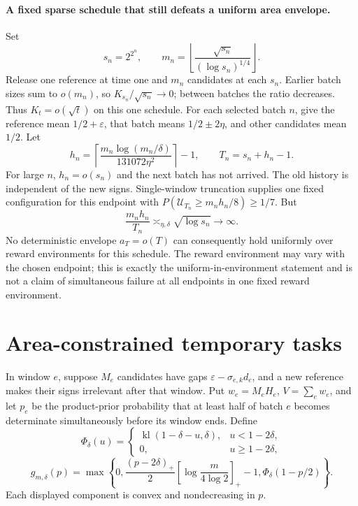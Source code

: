 \documentclass[11pt]{article}
\theoremstyle{remark}
\begin{document}
\paragraph{A fixed sparse schedule that still defeats a uniform area envelope.}
Set
\[
 s_n=2^{2^n},\qquad
 m_n=\left\lfloor\frac{\sqrt{s_n}}{(\log s_n)^{1/4}}\right\rfloor.
\]
Release one reference at time one and $m_n$ candidates at each $s_n$.
Earlier batch sizes sum to $o(m_n)$, so $K_{s_n}/\sqrt{s_n}\to0$; between
batches the ratio decreases. Thus $K_t=o(\sqrt t)$ on this one schedule.
For each selected batch $n$, give the reference mean $1/2+\varepsilon$,
that batch means $1/2\pm2\eta$, and other candidates mean $1/2$. Let
\[
 h_n=\left\lceil\frac{m_n\log(m_n/\delta)}{131072\eta^2}\right\rceil-1,
 \qquad T_n=s_n+h_n-1.
\]
For large $n$, $h_n=o(s_n)$ and the next batch has not arrived. The old
history is independent of the new signs. Single-window truncation supplies
one fixed configuration for this endpoint with
$P(\mathcal U_{T_n}\ge m_nh_n/8)\ge1/7$. But
\[
 \frac{m_nh_n}{T_n}\asymp_{\eta,\delta}\sqrt{\log s_n}\longrightarrow\infty.
\]
No deterministic envelope $a_T=o(T)$ can consequently hold uniformly over
reward environments for this schedule. The reward environment may vary
with the chosen endpoint; this is exactly the uniform-in-environment
statement and is not a claim of simultaneous failure at all endpoints in
one fixed reward environment.

\section{Area-constrained temporary tasks}
\label{app:area_lower}

In window $e$, suppose $M_e$ candidates have gaps
$\varepsilon-\sigma_{e,k}d_e$, and a new reference makes their signs
irrelevant after that window. Put $w_e=M_eH_e$, $V=\sum_ew_e$, and let
$p_e$ be the product-prior probability that at least half of batch $e$ becomes
determinate simultaneously before its window ends. Define
\[
 \Phi_\delta(u)=
 \begin{cases}
  \operatorname{kl}(1-\delta-u,\delta),&u<1-2\delta,\\
  0,&u\ge1-2\delta,
 \end{cases}
\]
\[
 g_{m,\delta}(p)=\max\left\{0,
 \frac{(p-2\delta)_+}{2}
       \left[\log\frac m{4\log2}\right]_+-1,
 \Phi_\delta(1-p/2)\right\}.
\]
Each displayed component is convex and nondecreasing in $p$.
\end{document}
